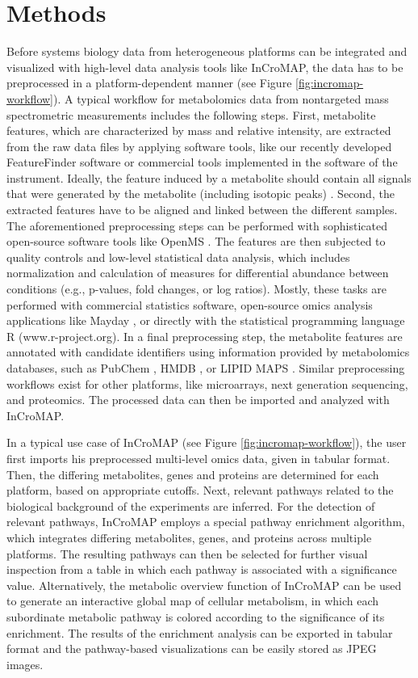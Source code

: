 \documentclass[final,5p,times,twocolumn]{elsarticle}
\begin{document}
\section{Methods}
Before systems biology data from heterogeneous platforms can be integrated and visualized with high-level data analysis tools like InCroMAP, the data has to be preprocessed in a platform-dependent manner (see Figure \ref{fig:incromap-workflow}). A typical workflow for metabolomics data from nontargeted mass spectrometric measurements includes the following steps. First, metabolite features, which are characterized by mass and relative intensity, are extracted from the raw data files by applying software tools, like our recently developed FeatureFinder software \cite{Kenar2014} or commercial tools implemented in the software of the instrument. Ideally, the feature induced by a metabolite should contain all signals that were generated by the metabolite (including isotopic peaks) \cite{Kenar2014}. Second, the extracted features have to be aligned and linked between the different samples. The aforementioned preprocessing steps can be performed with sophisticated open-source software tools like OpenMS \cite{
Sturm2008}. The features are then subjected to quality controls and low-level statistical data analysis, which includes normalization and calculation of measures for differential abundance between conditions (e.g., p-values, fold changes, or log ratios). Mostly, these tasks are performed with commercial statistics software, open-source omics analysis applications like Mayday \cite{Battke2010}, or directly with the statistical programming language R (www.r-project.org). In a final preprocessing step, the metabolite features are annotated with candidate identifiers using information provided by metabolomics databases, such as PubChem \cite{Wang2009}, HMDB \cite{Wishart2009}, or LIPID MAPS \cite{Sud2007}. Similar preprocessing workflows exist for other platforms, like microarrays, next generation sequencing, and proteomics. The processed data can then be imported and analyzed with InCroMAP.

In a typical use case of InCroMAP (see Figure \ref{fig:incromap-workflow}), the user first imports his preprocessed multi-level omics data, given in tabular format. Then, the differing metabolites, genes and proteins are determined for each platform, based on appropriate cutoffs. Next, relevant pathways related to the biological background of the experiments are inferred. For the detection of relevant pathways, InCroMAP employs a special pathway enrichment algorithm, which integrates differing metabolites, genes, and proteins across multiple platforms. The resulting pathways can then be selected for further visual inspection from a table in which each pathway is associated with a significance value. Alternatively, the metabolic overview function of InCroMAP can be used to generate an interactive global map of cellular metabolism, in which each subordinate metabolic pathway is colored according to the significance of its enrichment. The results of the enrichment analysis can be 
exported in tabular format and the pathway-based visualizations can be easily stored as JPEG images.
\end{document}
